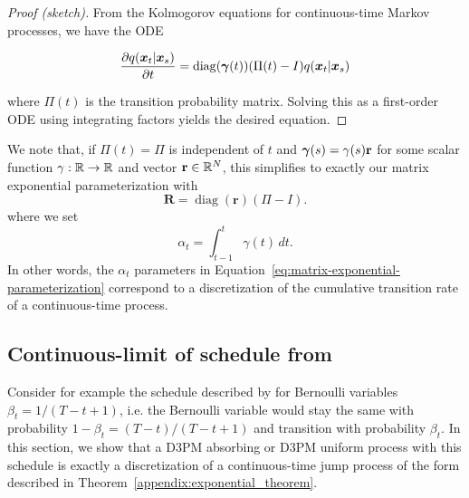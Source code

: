 \begin{proof}[Proof (sketch)]

From the Kolmogorov equations for continuous-time Markov processes, we have the ODE

$$\frac{\partial q(\boldsymbol{x}_t | \boldsymbol{x}_s)}{\partial t} = \operatorname{diag}(\boldsymbol{\gamma}(t))(\Pi(t) - I) q(\boldsymbol{x}_t | \boldsymbol{x}_s)$$

where $\Pi(t)$ is the transition probability matrix. Solving this as a first-order ODE using integrating factors yields the desired equation.
\end{proof}

We note that, if $\Pi(t) = \Pi$ is independent of $t$ and $\boldsymbol{\gamma}(s) = \gamma(s) \mathbf{r}$ for some scalar function $\gamma : \mathbb{R} \to \mathbb{R}$ and vector $\mathbf{r} \in \mathbb{R}^N$, this simplifies to exactly our matrix exponential parameterization with
\[
\mathbf{R} = \operatorname{diag}(\mathbf{r})(\Pi - I).
\]
where we set
\[
\alpha_t = \int_{t-1}^t \gamma(t)\,dt.
\]
In other words, the $\alpha_t$ parameters in Equation~\ref{eq:matrix-exponential-parameterization} correspond to a discretization of the cumulative transition rate of a continuous-time process.

\subsection{Continuous-limit of schedule from \citet{sohl2015deep}}

\label{appendix:jsd_rates}

Consider for example the schedule described by \citet{sohl2015deep} for Bernoulli variables $\beta_t = 1/(T - t + 1)$, i.e. the Bernoulli variable would stay the same with probability $1 - \beta_t = (T - t)/(T - t + 1)$ and transition with probability $\beta_t$. In this section, we show that a D3PM absorbing or D3PM uniform process with this schedule is exactly a discretization of a continuous-time jump process of the form described in Theorem~\ref{appendix:exponential_theorem}.

